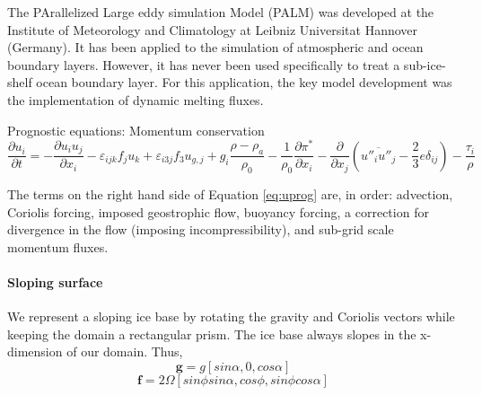 \documentclass[draft]{styles/agujournal2019}
\begin{document}
    The PArallelized Large eddy simulation Model (PALM) was developed at the Institute of Meteorology and Climatology at Leibniz Universitat Hannover (Germany). It has been applied to the simulation of atmospheric and ocean boundary layers. However, it has never been used specifically to treat a sub-ice-shelf ocean boundary layer. For this application, the key model development was the implementation of dynamic melting fluxes. 

	Prognostic equations:
	Momentum conservation
	\begin{equation} \label{eq:uprog}
	\frac{\partial u_i}{\partial t} = 
	-\frac{\partial u_i u_j}{\partial x_i}
	-\varepsilon_{ijk} f_j u_k 
	+ \varepsilon_{i3j} f_3 u_{g,j} 
    + g_i \frac{\rho - \rho_a}{\rho_0}
	- \frac{1}{\rho_0}\frac{\partial \pi^*}{\partial x_i}
	- \frac{\partial}{\partial x_j}(\overline{u''_i u''_j} - \frac{2}{3}e\delta_{ij})
	- \frac{\tau_i}{\rho}
	\end{equation}
	
	The terms on the right hand side of Equation \ref{eq:uprog} are, in order: advection, Coriolis forcing, imposed geostrophic flow, buoyancy forcing, a correction for divergence in the flow (imposing incompressibility), and sub-grid scale momentum fluxes. 
	
	\paragraph{Sloping surface}
	We represent a sloping ice base by rotating the gravity and Coriolis vectors while keeping the domain a rectangular prism. The ice base always slopes in the x-dimension of our domain. 
	Thus, 
	\begin{equation} \label{eq:g}
    	\textbf{g} = g [sin \alpha,0,cos \alpha]
    \end{equation}
	\begin{equation} \label{eq:f}
        \textbf{f} = 2 \Omega [sin \phi sin \alpha,cos \phi,sin \phi cos \alpha]
	\end{equation}
	
\end{document}
